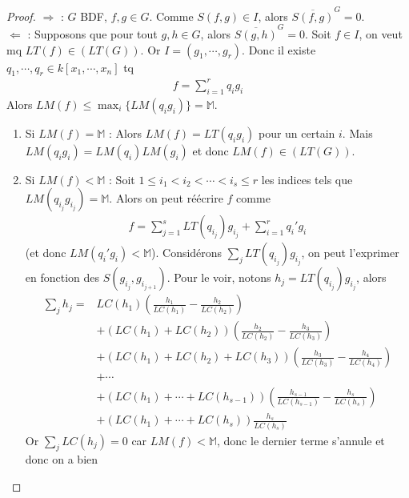             \begin{proof}
                $\Rightarrow$ : $G$ BDF, $f,g \in G$. Comme $S(f,g) \in I$, alors $\overline{S(f,g)}^G = 0$. \\
                $\Leftarrow$ : Supposons que pour tout $g,h \in G$, alors $\overline{S(g,h)}^G = 0$. Soit $f \in I$, on veut mq $LT(f) \in (LT(G))$. Or $I = (g_1, \cdots, g_r)$. Donc il existe $q_1, \cdots, q_r \in k[x_1, \cdots, x_n]$ tq 
                \begin{align*}
                    f = \sum_{i = 1}^r q_ig_i
                \end{align*}
                Alors $LM(f) \leq \max_i \{LM(q_ig_i)\} = \mathbb{M}$.
                \begin{enumerate}
                    \item Si $LM(f) = \mathbb{M}$ : Alors $LM(f) = LT(q_ig_i)$ pour un certain $i$. Mais $LM(q_ig_i) = LM(q_i)LM(g_i)$ et donc $LM(f) \in (LT(G))$.
                    \item Si $LM(f) < \mathbb{M}$ : Soit $1 \leq i_1 < i_2 < \cdots < i_s \leq r$ les indices tels que $LM(q_{i_j}g_{i_j}) = \mathbb{M}$. Alors on peut réécrire $f$ comme
                    \begin{align*}
                        f = \sum_{j = 1}^s LT(q_{i_j})g_{i_j} + \sum_{i = 1}^r q_i'g_i
                    \end{align*}
                    (et donc $LM(q_i'g_i) < \mathbb{M}$). Considérons $\sum_j LT(q_{i_j})g_{i_j}$, on peut l'exprimer en fonction des $S(g_{i_j}, g_{i_{j+1}})$. Pour le voir, notons $h_j = LT(q_{i_j})g_{i_j}$, alors
                    \begin{align*}
                        \sum_j h_j = &LC(h_1)\left( \frac{h_1}{LC(h_1)} - \frac{h_2}{LC(h_2)} \right) \\
                        &+ (LC(h_1) + LC(h_2))\left( \frac{h_2}{LC(h_2)} - \frac{h_3}{LC(h_3)} \right) \\
                        &+ (LC(h_1) + LC(h_2) + LC(h_3))\left( \frac{h_3}{LC(h_3)} - \frac{h_4}{LC(h_4)} \right) \\
                        & + \cdots \\
                        &+(LC(h_1) + \cdots + LC(h_{s-1}))\left( \frac{h_{s-1}}{LC(h_{s-1})} - \frac{h_s}{LC(h_s)} \right) \\
                        &+ (LC(h_1) + \cdots + LC(h_s))\frac{h_s}{LC(h_s)}
                    \end{align*}
                    Or $\sum_j LC(h_j) = 0$ car $LM(f) < \mathbb{M}$, donc le dernier terme s'annule et donc on a bien

\end{enumerate}
\end{proof}
